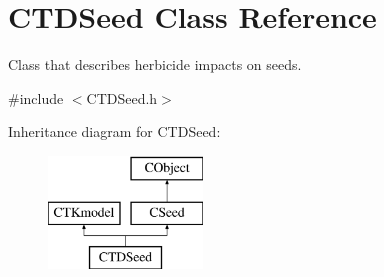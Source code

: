 \hypertarget{class_c_t_d_seed}{}\section{C\+T\+D\+Seed Class Reference}
\label{class_c_t_d_seed}


Class that describes herbicide impacts on seeds.  




{\ttfamily \#include $<$C\+T\+D\+Seed.\+h$>$}

Inheritance diagram for C\+T\+D\+Seed\+:\begin{figure}[H]
\begin{center}
\leavevmode
\includegraphics[height=3.000000cm]{class_c_t_d_seed}
\end{center}
\end{figure}
